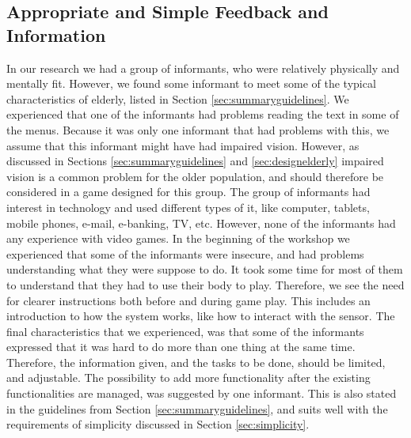 \subsection{Appropriate and Simple Feedback and Information}
In our research we had a group of informants, who were relatively physically and mentally fit. However, we found some informant to meet some of the typical characteristics of elderly, listed in Section \ref{sec:summaryguidelines}. We experienced that one of the informants had problems reading the text in some of the menus. Because it was only one informant that had problems with this, we assume that this informant might have had impaired vision. However, as discussed in Sections \ref{sec:summaryguidelines} and  \ref{sec:designelderly} impaired vision is a common problem for the older population, and should therefore be considered in a game designed for this group. The group of informants had interest in technology and used different types of it, like computer, tablets, mobile phones, e-mail, e-banking, TV, etc. However, none of the informants had any experience with video games. In the beginning of the workshop we experienced that some of the informants were insecure, and had problems understanding what they were suppose to do. It took some time for most of them to understand that they had to use their body to play. Therefore, we see the need for clearer instructions both before and during game play. This includes an introduction to how the system works, like how to interact with the sensor. The final characteristics that we experienced, was that some of the informants expressed that it was hard to do more than one thing at the same time. Therefore, the information given, and the tasks to be done, should be limited, and adjustable. The possibility to add more functionality after the existing functionalities are managed, was suggested by one informant. This is also stated in the guidelines from Section \ref{sec:summaryguidelines}, and suits well with the requirements of simplicity discussed in Section \ref{sec:simplicity}. 

